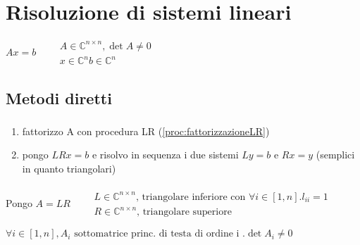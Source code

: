 \chapter{Risoluzione di sistemi lineari}
$ Ax=b \qquad \begin{array}{l}
A \in \mathbb{C}^{n \times n}, \det A \neq 0 \\
x \in \mathbb{C}^n
b \in \mathbb{C}^n
\end{array} $








\section{Metodi diretti}
\subsection{}


\begin{proc}
\begin{enumerate}
\item fattorizzo A con procedura LR (\ref{proc:fattorizzazioneLR})
\item pongo $ LRx = b $ e risolvo in sequenza i due sistemi $ Ly = b $ e $ Rx = y $ (semplici in quanto triangolari)
\end{enumerate}
\end{proc}


\subsubsection{}
Pongo $ A = LR \qquad \begin{array}{l}
L \in \mathbb{C}^{n \times n} \text{, triangolare inferiore con } \forall i \in [1,n].l_{ii} = 1 \\
R \in \mathbb{C}^{n \times n} \text{, triangolare superiore}
\end{array} $ 

\askip

 $ \forall i \in [1,n], A_i \text{ sottomatrice princ. di testa di ordine i }. \det A_i \neq 0 $

\askip

